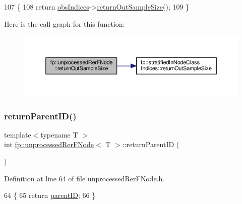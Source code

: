 \begin{DoxyCode}
107                                                 \{
108                     \textcolor{keywordflow}{return} \hyperlink{classfp_1_1unprocessedRerFNode_ad52d9d508bf378bc793b8cf961163735}{obsIndices}->\hyperlink{classfp_1_1stratifiedInNodeClassIndices_a6630b77af340d2023d88bafa87b94cae}{returnOutSampleSize}();
109                 \}
\end{DoxyCode}
Here is the call graph for this function\+:
\nopagebreak
\begin{figure}[H]
\begin{center}
\leavevmode
\includegraphics[width=350pt]{classfp_1_1unprocessedRerFNode_a850d04831326a6d700258bc8526cf7a2_cgraph}
\end{center}
\end{figure}
\mbox{\label{classfp_1_1unprocessedRerFNode_a94fadd35ce0d5c9bf446c3c9da534cbb}} 
\subsubsection{\texorpdfstring{return\+Parent\+I\+D()}{returnParentID()}}
{\footnotesize\ttfamily template$<$typename T $>$ \\
int \hyperlink{classfp_1_1unprocessedRerFNode}{fp\+::unprocessed\+Rer\+F\+Node}$<$ T $>$\+::return\+Parent\+ID (\begin{DoxyParamCaption}{ }\end{DoxyParamCaption})\hspace{0.3cm}{\ttfamily [inline]}}



Definition at line 64 of file unprocessed\+Rer\+F\+Node.\+h.


\begin{DoxyCode}
64                                            \{
65                     \textcolor{keywordflow}{return} \hyperlink{classfp_1_1unprocessedRerFNode_ab87cfcf5df700dbc7ec02c87057b27aa}{parentID};
66                 \}
\end{DoxyCode}
\mbox{\label{classfp_1_1unprocessedRerFNode_a4a8ede0f5b6e34c39bd10ce40ef1f110}} 
